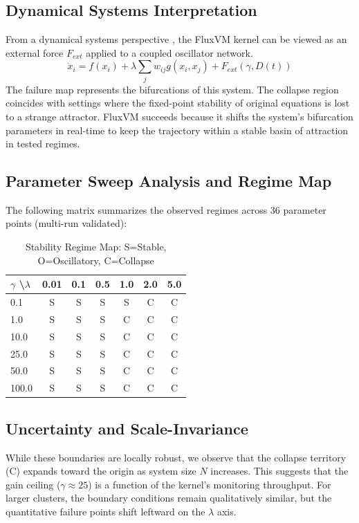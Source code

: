 \documentclass{article}
\begin{document}
\subsection{Dynamical Systems Interpretation}
From a dynamical systems perspective \cite{sontag1998mathematical}, the FluxVM kernel can be viewed as an external force $F_{ext}$ applied to a coupled oscillator network.
\begin{equation}
    \dot{x}_i = f(x_i) + \lambda \sum_{j} w_{ij} g(x_i, x_j) + F_{ext}(\gamma, D(t))
\end{equation}
The failure map represents the bifurcations of this system. The collapse region coincides with settings where the fixed-point stability of original equations is lost to a strange attractor. FluxVM succeeds because it shifts the system's bifurcation parameters in real-time to keep the trajectory within a stable basin of attraction in tested regimes.

\subsection{Parameter Sweep Analysis and Regime Map}
The following matrix summarizes the observed regimes across 36 parameter points (multi-run validated):
\begin{table}[h]
\centering
\begin{tabular}{|l|c|c|c|c|c|c|}
\hline
\textbf{$\gamma$ \textbackslash $\lambda$} & \textbf{0.01} & \textbf{0.1} & \textbf{0.5} & \textbf{1.0} & \textbf{2.0} & \textbf{5.0} \\ \hline
0.1 & S & S & S & S & C & C \\ \hline
1.0 & S & S & S & C & C & C \\ \hline
10.0 & S & S & S & C & C & C \\ \hline
25.0 & S & S & S & C & C & C \\ \hline
50.0 & S & S & S & C & C & C \\ \hline
100.0 & S & S & S & C & C & C \\ \hline
\end{tabular}
\caption{Stability Regime Map: S=Stable, O=Oscillatory, C=Collapse}
\end{table}

\subsection{Uncertainty and Scale-Invariance}
While these boundaries are locally robust, we observe that the collapse territory (C) expands toward the origin as system size $N$ increases. This suggests that the gain ceiling ($\gamma \approx 25$) is a function of the kernel's monitoring throughput. For larger clusters, the boundary conditions remain qualitatively similar, but the quantitative failure points shift leftward on the $\lambda$ axis.
\end{document}
